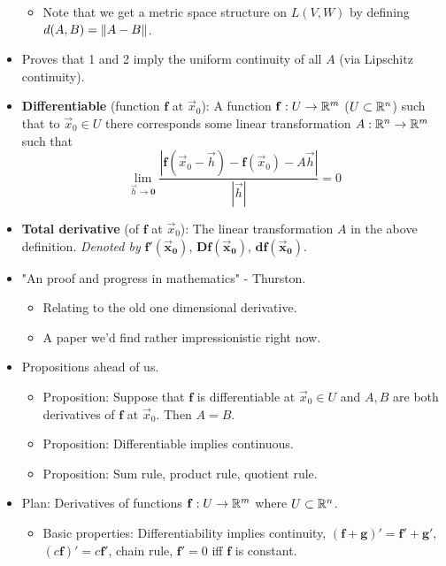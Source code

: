 \documentclass[../notes.tex]{subfiles}
\begin{document}
\begin{itemize}
\begin{itemize}
        \item Note that we get a metric space structure on $L(V,W)$ by defining $d(A,B)=\norm{A-B}$.
    \end{itemize}
    \item Proves that 1 and 2 imply the uniform continuity of all $A$ (via Lipschitz continuity).
    \item \textbf{Differentiable} (function $\mathbf{f}$ at $\vec{x}_0$): A function $\mathbf{f}:U\to\mathbb{R}^m$ ($U\subset\mathbb{R}^n$) such that to $\vec{x}_0\in U$ there corresponds some linear transformation $A:\mathbb{R}^n\to\mathbb{R}^m$ such that
    \begin{equation*}
        \lim_{\vec{h}\to\bm{0}}\frac{|\mathbf{f}(\vec{x}_0-\vec{h})-\mathbf{f}(\vec{x}_0)-A\vec{h}|}{|\vec{h}|} = 0
    \end{equation*}
    \item \textbf{Total derivative} (of $\mathbf{f}$ at $\vec{x}_0$): The linear transformation $A$ in the above definition. \emph{Denoted by} $\bm{\mathbf{f}'(\vec{x}_0)}$, $\bm{D\mathbf{f}(\vec{x}_0)}$, $\bm{d\mathbf{f}(\vec{x}_0)}$.
    \item "An proof and progress in mathematics" - Thurston.
    \begin{itemize}
        \item Relating to the old one dimensional derivative.
        \item A paper we'd find rather impressionistic right now.
    \end{itemize}
    \item Propositions ahead of us.
    \begin{itemize}
        \item Proposition: Suppose that $\mathbf{f}$ is differentiable at $\vec{x}_0\in U$ and $A,B$ are both derivatives of $\mathbf{f}$ at $\vec{x}_0$. Then $A=B$.
        \item Proposition: Differentiable implies continuous.
        \item Proposition: Sum rule, product rule, quotient rule.
    \end{itemize}
    \item {}Plan: Derivatives of functions $\mathbf{f}:U\to\mathbb{R}^m$ where $U\subset\mathbb{R}^n$.
    \begin{itemize}
        \item Basic properties: Differentiability implies continuity, $(\mathbf{f}+\mathbf{g})'=\mathbf{f}'+\mathbf{g}'$, $(c\mathbf{f})'=c\mathbf{f}'$, chain rule, $\mathbf{f}'=0$ iff $\mathbf{f}$ is constant.

\end{itemize}
\end{itemize}
\end{document}
